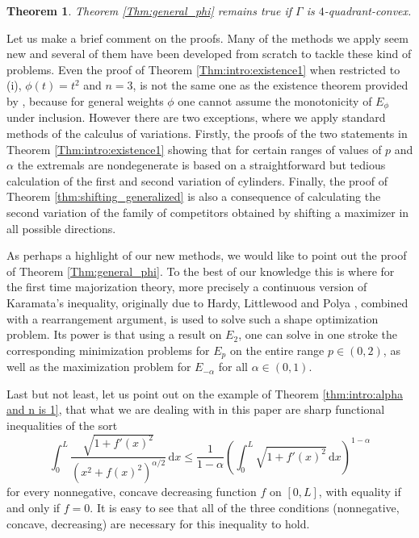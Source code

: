 \documentclass[10pt,leqno]{amsart}
\newcommand{\dd}{\, \mathrm{d}}
\newtheorem{Theorem}{Theorem}
\numberwithin{Theorem}{section}
\theoremstyle{definition}
\theoremstyle{remark}
\numberwithin{equation}{section}
\numberwithin{equation}{section}
\begin{document}
\begin{Theorem}\label{thm:four quadrant convex}
Theorem \ref{Thm:general_phi} remains true if $\Gamma$ is $4$-quadrant-convex.
\end{Theorem}

Let us make a brief comment on the proofs. Many of the methods we apply seem  new and several of them have been developed from scratch to tackle these kind of problems.   Even the proof of Theorem \ref{Thm:intro:existence1} when restricted to (i), $\phi(t)=t^2$ and $n=3$, is not the same one as the existence theorem provided by \cite{FreitasLaugesenLiddell}, because for general weights $\phi$ one cannot assume the monotonicity of $E_{\phi}$ under inclusion. However there are two exceptions, where we apply standard methods of the calculus of variations. Firstly, the proofs of the two statements in Theorem \ref{Thm:intro:existence1} showing that for certain ranges of values of $p$ and $\alpha$ the extremals are nondegenerate is based on a straightforward but  tedious calculation of the first and second variation of  cylinders. Finally, the proof of Theorem \ref{thm:shifting_generalized} is also a consequence of calculating the second variation of the family of competitors obtained by shifting a maximizer in all possible directions.

As perhaps a highlight of our new methods, we would like to point out the proof of Theorem \ref{Thm:general_phi}. To the best of our knowledge this is where for the first time majorization theory, more precisely a continuous version of Karamata's inequality, originally due to Hardy, Littlewood and Polya \cite{hardy1929some}, combined with a rearrangement argument, is used to solve such a shape optimization problem. Its power is that using a result on $E_2$, one can solve in one stroke the corresponding  minimization problems for  $E_p$ on the entire range $p\in (0,2)$, as well as the maximization problem for $E_{-\alpha}$ for all $\alpha\in (0,1).$ 

Last but not least, let us point out on the example of Theorem \ref{thm:intro:alpha and n is 1}, that what we are dealing with in this paper are sharp functional inequalities of the sort
\begin{equation}\label{intro:functional ineq}
  \int_0^L \frac{\sqrt{1+f'(x)^2}}{(x^2+f(x)^2)^{\alpha/2}}\dd x \leq \frac{1}{1-\alpha} \left(\int_0^L \sqrt{1+f'(x)^2} \dd x \right)^{1-\alpha}
\end{equation}
for every nonnegative, concave decreasing function $f$ on $[0,L]$, with equality if and only if $f=0.$ It is easy to see that all of  the three conditions (nonnegative, concave, decreasing) are necessary for this inequality to hold. 
\end{document}
